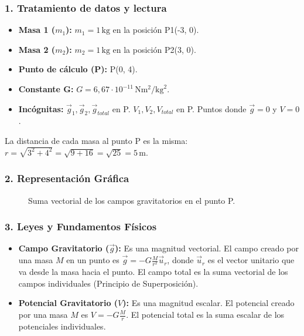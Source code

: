 \subsubsection*{1. Tratamiento de datos y lectura}
\begin{itemize}
    \item \textbf{Masa 1 ($m_1$):} $m_1 = 1 \, \text{kg}$ en la posición P1(-3, 0).
    \item \textbf{Masa 2 ($m_2$):} $m_2 = 1 \, \text{kg}$ en la posición P2(3, 0).
    \item \textbf{Punto de cálculo (P):} P(0, 4).
    \item \textbf{Constante G:} $G=6,67\cdot10^{-11}\,\text{N}\text{m}^2/\text{kg}^2$.
    \item \textbf{Incógnitas:} $\vec{g}_1, \vec{g}_2, \vec{g}_{total}$ en P. $V_1, V_2, V_{total}$ en P. Puntos donde $\vec{g}=0$ y $V=0$.
\end{itemize}
La distancia de cada masa al punto P es la misma: $r = \sqrt{3^2 + 4^2} = \sqrt{9+16} = \sqrt{25}=5\,\text{m}$.

\subsubsection*{2. Representación Gráfica}
\begin{figure}[H]
    \centering
    \caption{Suma vectorial de los campos gravitatorios en el punto P.}
\end{figure}

\subsubsection*{3. Leyes y Fundamentos Físicos}
\begin{itemize}
    \item \textbf{Campo Gravitatorio ($\vec{g}$):} Es una magnitud vectorial. El campo creado por una masa $M$ en un punto es $\vec{g} = -G\frac{M}{r^2}\vec{u}_r$, donde $\vec{u}_r$ es el vector unitario que va desde la masa hacia el punto. El campo total es la suma vectorial de los campos individuales (Principio de Superposición).
    \item \textbf{Potencial Gravitatorio ($V$):} Es una magnitud escalar. El potencial creado por una masa $M$ es $V = -G\frac{M}{r}$. El potencial total es la suma escalar de los potenciales individuales.
\end{itemize}

